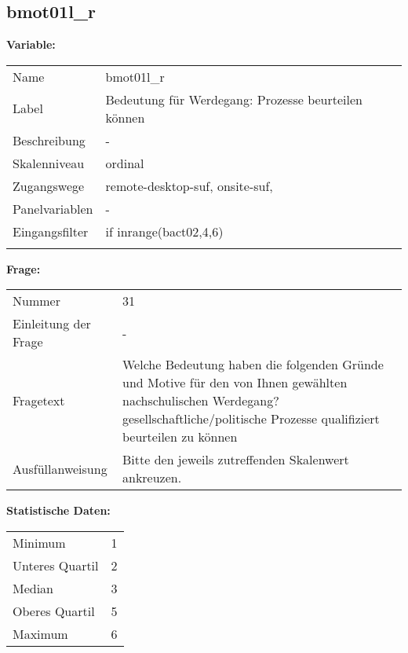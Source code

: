 	
	
	\subsection{bmot01l\_r}
	\label{subSection:bmot01l_r}

	\noindent\textbf{Variable:}\\
		\begin{tabular}{lL{11.3cm}}
			\label{tableVariable:bmot01l_r}
			Name & bmot01l\_r \\
			Label & Bedeutung für Werdegang: Prozesse beurteilen können \\
			Beschreibung & - \\
			Skalenniveau & ordinal \\
			Zugangswege &
				remote-desktop-suf,
				onsite-suf,
 \\
			Panelvariablen & -
			 \\
			Eingangsfilter & if inrange(bact02,4,6)  \\
 \\
		\end{tabular}

		\vspace*{1 cm}
		\noindent\textbf{Frage:}\\
		\begin{tabular}{lL{11.3cm}}
			\label{tableQuestion:bmot01l_r}
			Nummer & 31 \\
			Einleitung der Frage & - \\
			Fragetext & Welche Bedeutung haben die folgenden Gründe und Motive für den von Ihnen gewählten nachschulischen Werdegang?
gesellschaftliche/politische Prozesse qualifiziert beurteilen zu können \\
			Ausfüllanweisung & Bitte den jeweils zutreffenden Skalenwert ankreuzen. \\
		\end{tabular}


		\vspace*{1 cm}
		\noindent\textbf{Statistische Daten:}\\
			\begin{tabular}{ll}
				\label{tableStatistics:bmot01l_r}
					Minimum & 1 \\
					Unteres Quartil & 2 \\
					Median & 3 \\
					Oberes Quartil & 5 \\
					Maximum & 6 \\
			\end{tabular}



